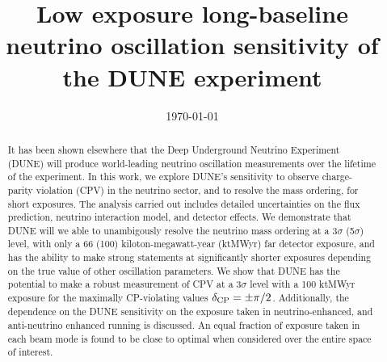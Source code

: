 \documentclass[aps,prd,twocolumn,showpacs,superscriptaddress,nofootinbib,floatfix,letterpaper]{revtex4-1}
\newcommand{\deltacp}{\ensuremath{\delta_{\rm CP}}\xspace}   %
\begin{document}
\title{Low exposure long-baseline neutrino oscillation sensitivity of the DUNE experiment}
\date{\today}
\noaffiliation
% 

\begin{abstract}
It has been shown elsewhere that the Deep Underground Neutrino Experiment (DUNE) will produce world-leading neutrino oscillation measurements over the lifetime of the experiment. In this work, we explore DUNE's sensitivity to observe charge-parity violation (CPV) in the neutrino sector, and to resolve the mass ordering, for short exposures. The analysis carried out includes detailed uncertainties on the flux prediction, neutrino interaction model, and detector effects. We demonstrate that DUNE will we able to unambigously resolve the neutrino mass ordering at a 3$\sigma$ (5$\sigma$) level, with only a 66 (100) kiloton-megawatt-year (ktMWyr) far detector exposure, and has the ability to make strong statements at significantly shorter exposures depending on the true value of other oscillation parameters. We show that DUNE has the potential to make a robust measurement of CPV at a 3$\sigma$ level with a 100 ktMWyr exposure for the maximally CP-violating values $\deltacp = \pm\pi/2$. Additionally, the dependence on the DUNE sensitivity on the exposure taken in neutrino-enhanced, and anti-neutrino enhanced running is discussed. An equal fraction of exposure taken in each beam mode is found to be close to optimal when considered over the entire space of interest.
\end{abstract}

\maketitle











\appendix*

\end{document}
